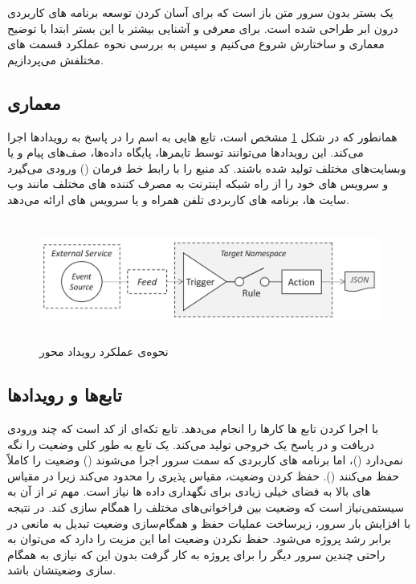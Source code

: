  یک بستر بدون سرور متن باز است که برای آسان کردن توسعه برنامه های کاربردی درون ابر طراحی شده است. برای معرفی و آشنایی بیشتر با این بستر ابتدا با توضیح معماری و ساختارش شروع می‌کنیم و سپس به بررسی نحوه عملکرد قسمت های مختلفش می‌پردازیم.

\subsection{معماری }

همانطور که در شکل \ref{OW-event-action} مشخص است،  تابع هایی به اسم  را در پاسخ به رویدادها اجرا می‌کند. این رویدادها می‌توانند توسط تایمرها، پایگاه داده‌ها، صف‌های پیام و یا وبسایت‌های مختلف تولید شده باشند.  کد منبع را با رابط خط فرمان () ورودی می‌گیرد و سرویس های خود را از راه  شبکه اینترنت به مصرف کننده های مختلف مانند وب سایت ها، برنامه های کاربردی تلفن همراه و یا سرویس های  ارائه می‌دهد. 
\begin{figure}[!h]
	\centering
	\includegraphics[height=4cm]{images/OW-event-action}
	\caption{نحوه‌ی عملکرد رویداد محور }
	\label{OW-event-action}
\end{figure}

\subsection{تابع‌ها و رویدادها}

 با اجرا کردن تابع ها کارها را انجام می‌دهد. تابع تکه‌ای از کد است که چند ورودی دریافت و در پاسخ یک خروجی تولید می‌کند. یک تابع به طور کلی وضعیت را نگه نمی‌دارد ()، اما برنامه های کاربردی که سمت سرور اجرا می‌شوند (‌) وضعیت را کاملاً حفظ می‌کنند (). حفظ کردن وضعیت، مقیاس پذیری را محدود می‌کند زیرا در مقیاس های بالا به فضای خیلی زیادی برای نگهداری داده ها نیاز است. مهم تر از آن به سیستمی‌نیاز است که وضعیت بین فراخوانی‌های مختلف را همگام سازی کند. در نتیجه با افزایش بار سرور، زیرساخت عملیات حفظ و همگام‌سازی وضعیت تبدیل به مانعی در برابر رشد پروژه می‌شود. حفظ نکردن وضعیت اما این مزیت را دارد که می‌توان به راحتی چندین سرور دیگر را برای پروژه به کار گرفت بدون این که نیازی به همگام سازی وضعیتشان باشد.

